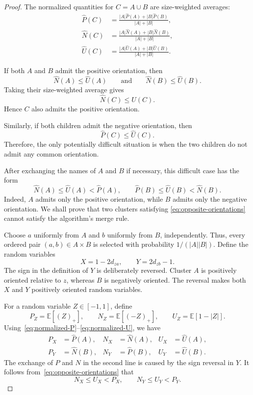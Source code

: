\documentclass[11pt]{article}
\begin{document}
\begin{proof}
The normalized quantities for $C=A\cup B$ are size-weighted averages:
\begin{align*}
    \widehat P(C)
    &=
    \frac{|A|\widehat P(A)+|B|\widehat P(B)}
         {|A|+|B|},\\
    \widehat N(C)
    &=
    \frac{|A|\widehat N(A)+|B|\widehat N(B)}
         {|A|+|B|},\\
    \widehat U(C)
    &=
    \frac{|A|\widehat U(A)+|B|\widehat U(B)}
         {|A|+|B|}.
\end{align*}

If both $A$ and $B$ admit the positive orientation, then
\[
    \widehat N(A)\le\widehat U(A)
    \qquad\text{and}\qquad
    \widehat N(B)\le\widehat U(B).
\]
Taking their size-weighted average gives
\[
    \widehat N(C)\le\widehat U(C).
\]
Hence $C$ also admits the positive orientation.

Similarly, if both children admit the negative orientation, then
\[
    \widehat P(C)\le\widehat U(C).
\]
Therefore, the only potentially difficult situation is when the two children
do not admit any common orientation.

After exchanging the names of $A$ and $B$ if necessary, this difficult case
has the form
\begin{equation}
    \widehat N(A)\le\widehat U(A)<\widehat P(A),
    \qquad
    \widehat P(B)\le\widehat U(B)<\widehat N(B).
    \label{eq:opposite-orientations}
\end{equation}
Indeed, $A$ admits only the positive orientation, while $B$ admits only the
negative orientation.  We shall prove that two clusters satisfying
\eqref{eq:opposite-orientations} cannot satisfy the algorithm's merge rule.

Choose $a$ uniformly from $A$ and $b$ uniformly from $B$, independently.
Thus, every ordered pair $(a,b)\in A\times B$ is selected with probability
$1/(|A||B|)$.  Define the random variables
\[
    X=1-2d_{za},
    \qquad
    Y=2d_{zb}-1.
\]
The sign in the definition of $Y$ is deliberately reversed.  Cluster $A$ is
positively oriented relative to $z$, whereas $B$ is negatively oriented.
The reversal makes both $X$ and $Y$ positively oriented random variables.

For a random variable $Z\in[-1,1]$, define
\[
    P_Z=\mathbb E[(Z)_+],
    \qquad
    N_Z=\mathbb E[(-Z)_+],
    \qquad
    U_Z=\mathbb E[1-|Z|].
\]
Using~\eqref{eq:normalized-P}--\eqref{eq:normalized-U}, we have
\begin{align*}
    P_X&=\widehat P(A),
    &
    N_X&=\widehat N(A),
    &
    U_X&=\widehat U(A),\\
    P_Y&=\widehat N(B),
    &
    N_Y&=\widehat P(B),
    &
    U_Y&=\widehat U(B).
\end{align*}
The exchange of $P$ and $N$ in the second line is caused by the sign reversal
in $Y$.  It follows from~\eqref{eq:opposite-orientations} that
\begin{equation}
    N_X\le U_X<P_X,
    \qquad
    N_Y\le U_Y<P_Y.
    \label{eq:X-Y-orientations}
\end{equation}


\end{proof}
\end{document}
